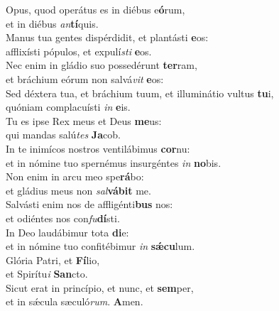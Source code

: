 \evenverse Opus, quod operátus es in diébus e\textbf{ó}rum,~\*\\
\evenverse et in diébus \textit{an}\textbf{tí}quis.\\
\oddverse Manus tua gentes dispérdidit, et plantásti \textbf{e}os:~\*\\
\oddverse afflixísti pópulos, et expulí\textit{sti} \textbf{e}os.\\
\evenverse Nec enim in gládio suo possedérunt \textbf{ter}ram,~\*\\
\evenverse et bráchium eórum non salvá\textit{vit} \textbf{e}os:\\
\oddverse Sed déxtera tua, et bráchium tuum, et illuminátio vultus \textbf{tu}i,~\*\\
\oddverse quóniam complacuísti \textit{in} \textbf{e}is.\\
\evenverse Tu es ipse Rex meus et Deus \textbf{me}us:~\*\\
\evenverse qui mandas salú\textit{tes} \textbf{Ja}cob.\\
\oddverse In te inimícos nostros ventilábimus \textbf{cor}nu:~\*\\
\oddverse et in nómine tuo spernémus insurgéntes \textit{in} \textbf{no}bis.\\
\evenverse Non enim in arcu meo spe\textbf{rá}bo:~\*\\
\evenverse et gládius meus non \textit{sal}\textbf{vá}\textbf{bit} me.\\
\oddverse Salvásti enim nos de affligénti\textbf{bus} nos:~\*\\
\oddverse et odiéntes nos con\textit{fu}\textbf{dí}sti.\\
\evenverse In Deo laudábimur tota \textbf{di}e:~\*\\
\evenverse et in nómine tuo confitébimur \textit{in} \textbf{sǽ}\textbf{cu}lum.\\
\oddverse Glória Patri, et \textbf{Fí}lio,~\*\\
\oddverse et Spirítu\textit{i} \textbf{San}cto.\\
\evenverse Sicut erat in princípio, et nunc, et \textbf{sem}per,~\*\\
\evenverse et in sǽcula sæculó\textit{rum}. \textbf{A}men.\\
